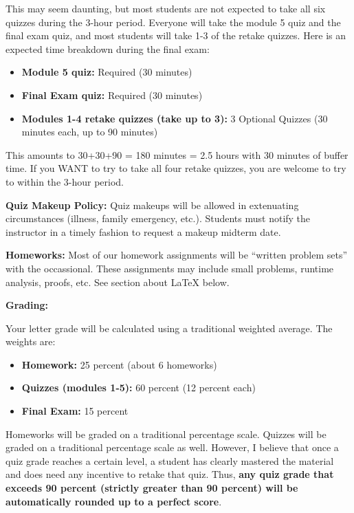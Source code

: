 \documentclass[12pt]{article}
\begin{document}
This may seem daunting, but most students are not expected to take all six quizzes during the 3-hour period. Everyone will take the module 5 quiz and the final exam quiz, and most students will take 1-3 of the retake quizzes. Here is an expected time breakdown during the final exam:

\begin{itemize}
\item  \textbf{Module 5 quiz:} Required (30 minutes)
\item  \textbf{Final Exam quiz:} Required (30 minutes)
\item  \textbf{Modules 1-4 retake quizzes (take up to 3):} 3 Optional Quizzes (30 minutes each, up to 90 minutes)
\end{itemize}

This amounts to 30+30+90 = 180 minutes = 2.5 hours with 30 minutes of buffer time. If you WANT to try to take all four retake quizzes, you are welcome to try to within the 3-hour period. 



\textbf{Quiz Makeup Policy:} Quiz makeups will be allowed in extenuating circumstances (illness, family emergency, etc.). Students must notify the instructor in a timely fashion to request a makeup midterm date.

\textbf{Homeworks:} Most of our homework assignments will be ``written problem sets'' with the occassional. These assignments may include small problems, runtime analysis, proofs, etc.   See section about \LaTeX{} below.

\textbf{Grading:} 

Your letter grade will be calculated using a traditional weighted average. The weights are:

\begin{itemize}
\item \textbf{Homework:} 25 percent (about 6 homeworks)
\item \textbf{Quizzes (modules 1-5):} 60 percent (12 percent each)
\item \textbf{Final Exam:} 15 percent
\end{itemize}

Homeworks will be graded on a traditional percentage scale. Quizzes will be graded on a traditional percentage scale as well. However, I believe that once a quiz grade reaches a certain level, a student has clearly mastered the material and does need any incentive to retake that quiz. Thus, \textbf{any quiz grade that exceeds 90 percent (strictly greater than 90 percent) will be automatically rounded up to a perfect score}.
\end{document}
